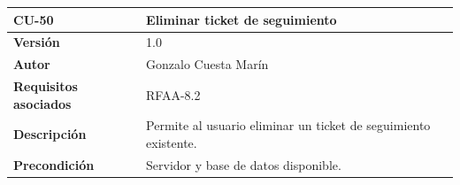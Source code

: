 \documentclass[
]{article}
\begin{document}
\begin{longtable}[]{@{}ll@{}}
\toprule
\begin{minipage}[b]{0.24\columnwidth}\raggedright
\textbf{CU-50}\strut
\end{minipage} & \begin{minipage}[b]{0.70\columnwidth}\raggedright
\textbf{Eliminar ticket de seguimiento}\strut
\end{minipage}\tabularnewline
\midrule
\endhead
\begin{minipage}[t]{0.24\columnwidth}\raggedright
\textbf{Versión}\strut
\end{minipage} & \begin{minipage}[t]{0.70\columnwidth}\raggedright
1.0\strut
\end{minipage}\tabularnewline
\begin{minipage}[t]{0.24\columnwidth}\raggedright
\textbf{Autor}\strut
\end{minipage} & \begin{minipage}[t]{0.70\columnwidth}\raggedright
Gonzalo Cuesta Marín\strut
\end{minipage}\tabularnewline
\begin{minipage}[t]{0.24\columnwidth}\raggedright
\textbf{Requisitos asociados}\strut
\end{minipage} & \begin{minipage}[t]{0.70\columnwidth}\raggedright
RFAA-8.2\strut
\end{minipage}\tabularnewline
\begin{minipage}[t]{0.24\columnwidth}\raggedright
\textbf{Descripción}\strut
\end{minipage} & \begin{minipage}[t]{0.70\columnwidth}\raggedright
Permite al usuario eliminar un ticket de seguimiento existente.\strut
\end{minipage}\tabularnewline
\begin{minipage}[t]{0.24\columnwidth}\raggedright
\textbf{Precondición}\strut
\end{minipage} & \begin{minipage}[t]{0.70\columnwidth}\raggedright
Servidor y base de datos disponible.


\end{minipage}
\end{longtable}
\end{document}
